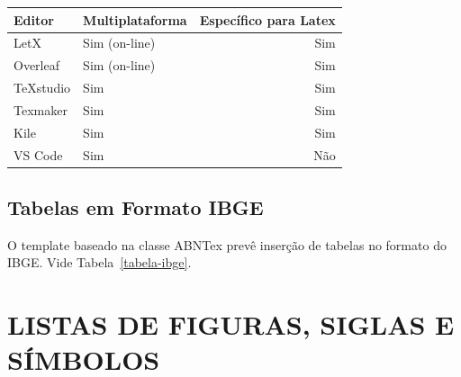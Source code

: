 \documentclass{templateppgmo}
\numberwithin{figure}{chapter}
\numberwithin{table}{chapter}
\numberwithin{quadro}{chapter}
\numberwithin{algoritmo}{chapter}
\numberwithin{codigo}{chapter}
\begin{document}
\begin{quadro}[htb]
\centering
\caption{Editores para \LaTeX.} \label{quadro:editores_texto_livres}
\begin{tabular}{|l|l|r|}        \hline
Editor     & Multiplataforma & Específico para Latex \\ \hline
LetX       & Sim (on-line)   & Sim                   \\
Overleaf   & Sim (on-line)   & Sim                   \\
TeXstudio  & Sim             & Sim                   \\
Texmaker   & Sim             & Sim                   \\
Kile       & Sim             & Sim                   \\
VS Code    & Sim             & Não                   \\ \hline
\end{tabular}

\end{quadro}



\section{Tabelas em Formato IBGE}

O template baseado na classe ABNTex prevê inserção de tabelas no formato do IBGE. Vide Tabela~\ref{tabela-ibge}.

\begin{table}[H]
  \end{table}


\chapter{LISTAS DE FIGURAS, SIGLAS E SÍMBOLOS}
\end{document}
